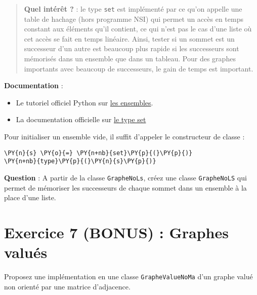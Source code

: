 \documentclass[12pt]{book}
\begin{document}
    \begin{quote}
\textbf{Quel intérêt ?} : le type \texttt{set} est implémenté par ce
qu'on appelle une table de hachage (hors programme NSI) qui permet un
accès en temps constant aux éléments qu'il contient, ce qui n'est pas le
cas d'une liste où cet accès se fait en temps linéaire. Ainsi, tester si
un sommet est un successeur d'un autre est beaucoup plus rapide si les
successeurs sont mémorisés dans un ensemble que dans un tableau. Pour
des graphes importants avec beaucoup de successeurs, le gain de temps
est important.
\end{quote}

    \textbf{Documentation} :

\begin{itemize}
\tightlist
\item
  Le tutoriel officiel Python sur
  \href{https://docs.python.org/fr/3/tutorial/datastructures.html\#sets}{les
  ensembles}.
\item
  La documentation officielle sur
  \href{https://docs.python.org/fr/3/library/stdtypes.html\#set-types-set-frozenset}{le
  type set}
\end{itemize}

    Pour initialiser un ensemble vide, il suffit d'appeler le constructeur
de classe :

    \begin{tcolorbox}[breakable, size=fbox, boxrule=1pt, pad at break*=1mm,colback=cellbackground, colframe=cellborder]
\begin{Verbatim}[commandchars=\\\{\}]
\PY{n}{s} \PY{o}{=} \PY{n+nb}{set}\PY{p}{(}\PY{p}{)}
\PY{n+nb}{type}\PY{p}{(}\PY{n}{s}\PY{p}{)}
\end{Verbatim}
\end{tcolorbox}

    \textbf{Question} : A partir de la classe \texttt{GrapheNoLs}, créez une
classe \texttt{GrapheNoLS} qui permet de mémoriser les successeurs de
chaque sommet dans un ensemble à la place d'une liste.



\section{Exercice 7 (BONUS) : Graphes valués}\label{exercice-8-bonus-graphes-valuuxe9s}

\Quest[1] Proposez une implémentation en une classe
\texttt{GrapheValueNoMa} d'un graphe valué non orienté par une matrice
d'adjacence.
\end{document}
